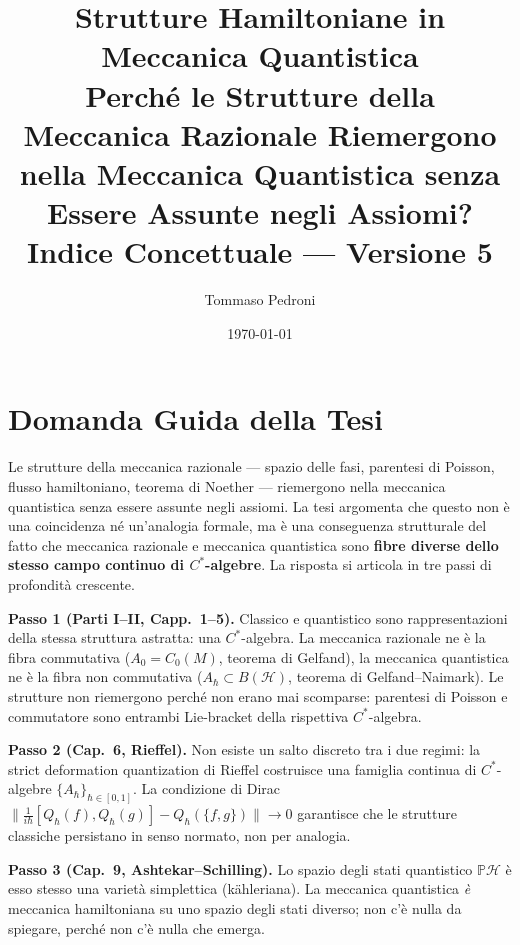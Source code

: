 \documentclass[12pt, a4paper]{article}
\title{%
	\textbf{Strutture Hamiltoniane in Meccanica Quantistica}\\[6pt]
	\large Perché le Strutture della Meccanica Razionale Riemergono\\
	nella Meccanica Quantistica senza Essere Assunte negli Assiomi?\\[4pt]
	\normalsize Indice Concettuale --- Versione 5
}
\author{Tommaso Pedroni}
\date{\today}
\begin{document}
	
	\maketitle
	\tableofcontents
	\newpage
	
	\section*{Domanda Guida della Tesi}
	
	Le strutture della meccanica razionale --- spazio delle fasi, parentesi di Poisson,
	flusso hamiltoniano, teorema di Noether --- riemergono nella meccanica quantistica
	senza essere assunte negli assiomi. La tesi argomenta che questo non è una coincidenza
	né un'analogia formale, ma è una conseguenza strutturale del fatto che meccanica
	razionale e meccanica quantistica sono \textbf{fibre diverse dello stesso campo continuo
		di $C^*$-algebre}. La risposta si articola in tre passi di profondità crescente.
	
	\medskip
	
	\textbf{Passo 1 (Parti I--II, Capp.\ 1--5).}
	Classico e quantistico sono rappresentazioni della stessa struttura astratta: una
	$C^*$-algebra. La meccanica razionale ne è la fibra commutativa
	($A_0 = C_0(M)$, teorema di Gelfand), la meccanica quantistica ne è la fibra
	non commutativa ($A_\hbar \subset B(\mathcal{H})$, teorema di Gelfand--Naimark).
	Le strutture non riemergono perché non erano mai scomparse: parentesi di Poisson
	e commutatore sono entrambi Lie-bracket della rispettiva $C^*$-algebra.
	
	\medskip
	
	\textbf{Passo 2 (Cap.\ 6, Rieffel).}
	Non esiste un salto discreto tra i due regimi: la strict deformation quantization
	di Rieffel costruisce una famiglia continua di $C^*$-algebre $\{A_\hbar\}_{\hbar \in [0,1]}$.
	La condizione di Dirac
	$\bigl\|\frac{1}{i\hbar}[Q_\hbar(f), Q_\hbar(g)] - Q_\hbar(\{f,g\})\bigr\| \to 0$
	garantisce che le strutture classiche persistano in senso normato, non per analogia.
	
	\medskip
	
	\textbf{Passo 3 (Cap.\ 9, Ashtekar--Schilling).}
	Lo spazio degli stati quantistico $\mathbb{P}\mathcal{H}$ è esso stesso una varietà
	simplettica (kähleriana). La meccanica quantistica \emph{è} meccanica hamiltoniana su
	uno spazio degli stati diverso; non c'è nulla da spiegare, perché non c'è nulla che emerga.
	
\end{document}
